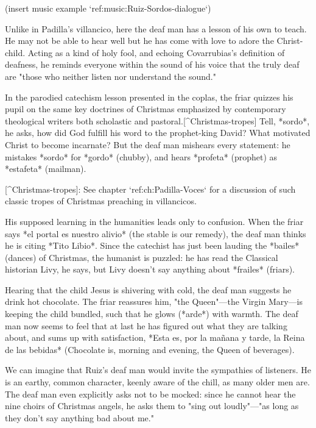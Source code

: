 (insert music example `ref:music:Ruiz-Sordos-dialogue`)
\label{music:Ruiz-Sordos-dialogue}

Unlike in Padilla's villancico, here the deaf man has a lesson of his own to
teach. 
He may not be able to hear well but he has come with love to adore the
Christ-child. 
Acting as a kind of holy fool, and echoing Covarrubias's definition of deafness,
he reminds everyone within the sound of his voice that the truly deaf are "those
who neither listen nor understand the sound." 

In the parodied catechism lesson presented in the coplas, the friar quizzes his
pupil on the same key doctrines of Christmas emphasized by contemporary
theological writers both scholastic and pastoral.[^Christmas-tropes] 
Tell, *sordo*, he asks, how did God fulfill his word to the
prophet-king David?
What motivated Christ to become incarnate?
But the deaf man mishears every statement: he mistakes *sordo* for *gordo*
(chubby), and hears *profeta* (prophet) as *estafeta* (mailman). 

[^Christmas-tropes]:
See chapter `ref:ch:Padilla-Voces` for a discussion of such classic tropes of
Christmas preaching in villancicos. 

His supposed learning in the humanities leads only to confusion. 
When the friar says *el portal es
nuestro alivio* (the stable is our remedy), the deaf man thinks he is citing
*Tito Libio*. 
Since the catechist has just been lauding the *bailes* (dances) of Christmas,
the humanist is puzzled: he has read the Classical historian Livy, he says, but
Livy doesn't say anything about *frailes* (friars). 

Hearing that the child Jesus is shivering with cold, the deaf man suggests he
drink hot chocolate. 
The friar reassures him, "the Queen"---the Virgin Mary---is keeping the
child bundled, such that he glows (*arde*) with warmth.
The deaf man now seems to feel that at last he has figured out what they are
talking about, and sums up with satisfaction, *Esta es, por la mañana y
tarde, la Reina de las bebidas* (Chocolate is, morning and evening, the Queen of
beverages). 

We can imagine that Ruiz's deaf man would invite the sympathies of listeners.
He is an earthy, common character, keenly aware of the chill, as many older men are.
The deaf man even explicitly asks not to be mocked:
since he cannot hear the nine choirs of Christmas angels, he asks them to "sing out
loudly"---"as long as they don't say anything bad about me." 

